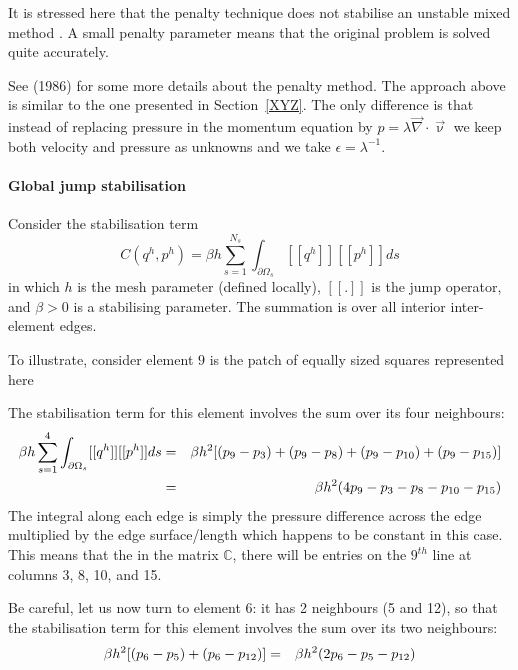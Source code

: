 It is stressed here that the penalty technique does not stabilise an  
unstable mixed method \cite{sike90}. A small penalty parameter 
means that the original problem is solved quite accurately.

See \textcite{cuss86} (1986) for some more details about the penalty method.
The approach above is similar to the one presented in Section~\ref{XYZ}. The only 
difference is that instead of replacing pressure in the momentum equation
by $p = \lambda \vec\nabla\cdot\vec\upnu$ we keep both velocity and pressure
as unknowns and we take $\epsilon=\lambda^{-1}$.

\paragraph{Global jump stabilisation}

Consider the stabilisation term
\[
C(q^h,p^h) = \beta h \sum_{s=1}^{N_s} \int_{\partial \Omega_s}[[ q^h ]]  [[p^h ]] ds
\]
in which $h$ is the mesh parameter (defined locally), $[[.]]$ is the jump operator,
and $\beta>0$ is a stabilising parameter. 
The summation is over all interior inter-element edges.

To illustrate, consider element $9$ is the patch of equally  sized
squares represented here

\begin{center}

\end{center}

The stabilisation term for this element involves the sum over its four neighbours:
\begin{eqnarray}
\beta h \sum_{s=1}^{4} \int_{\partial \Omega_s}[[ q^h ]]  [[p^h ]] ds
&=& \beta h^2 [ (p_9-p_3)+(p_9-p_8)+(p_9-p_{10})+(p_9-p_{15})   ]  \nonumber\\
&=& \beta h^2 ( 4 p_9-p_3 -p_8-p_{10} -p_{15})  \nonumber
\end{eqnarray}
The integral along each edge is simply the pressure difference across the edge 
multiplied by the edge surface/length which happens to be constant in this case.
This means that the in the matrix $\mathbb{C}$, there will be entries on the $9^{th}$
line at columns 3, 8, 10, and 15. 

Be careful, let us now turn to element 6: it has 2 neighbours (5 and 12), so that
the stabilisation term for this element involves the sum over its two neighbours:
\begin{eqnarray}
 \beta h^2 [ (p_6-p_5)+(p_6-p_{12})  ]  
&=& \beta h^2 ( 2 p_6-p_5 -p_{12} )  \nonumber
\end{eqnarray}

